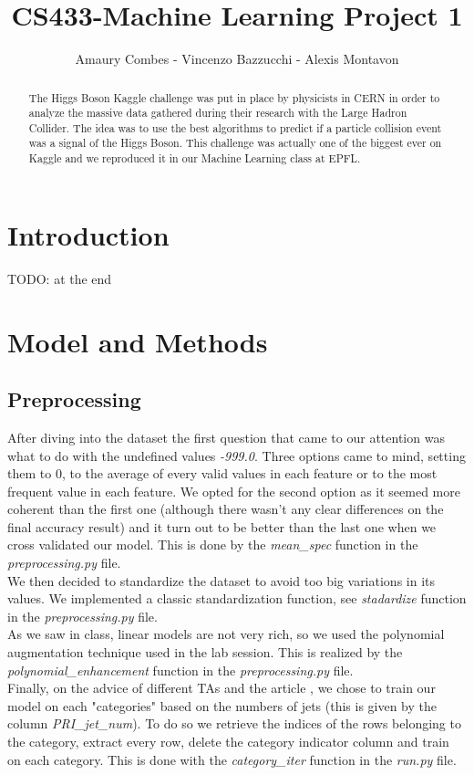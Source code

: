 \documentclass[10pt,conference,compsocconf]{IEEEtran}
\begin{document}
\title{CS433-Machine Learning Project 1}

\author{
  Amaury Combes - Vincenzo Bazzucchi - Alexis Montavon\\
}

\maketitle

\begin{abstract}
  The Higgs Boson Kaggle challenge was put in place by physicists in CERN in order to analyze the massive data gathered during their research with the Large Hadron Collider. The idea was to use the best algorithms to predict if a particle collision event was a signal of the Higgs Boson. This challenge was actually one of the biggest ever on Kaggle and we reproduced it in our Machine Learning class at EPFL.
\end{abstract}

\section{Introduction}

TODO: at the end

\section{Model and Methods}
\label{sec:model}
\subsection{Preprocessing}
After diving into the dataset the first question that came to our attention was what to do with the undefined values \textit{-999.0}. Three options came to mind, setting them to 0, to the average of every valid values in each feature or to the most frequent value in each feature. We opted for the second option as it seemed more coherent than the first one (although there wasn't any clear differences on the final accuracy result) and it turn out to be better than the last one when we cross validated our model. This is done by the \textit{mean\_spec} function in the \textit{preprocessing.py} file.\\ We then decided to standardize the dataset to avoid too big variations in its values. We implemented a classic standardization function, see \textit{stadardize} function in the \textit{preprocessing.py} file.\\ As we saw in class, linear models are not very rich, so we used the polynomial augmentation technique used in the lab session. This is realized by the \textit{polynomial\_enhancement} function in the \textit{preprocessing.py} file.\\
Finally, on the advice of different TAs and the article \cite{anderson04}, we chose to train our model on each "categories" based on the numbers of jets (this is given by the column \textit{PRI\_jet\_num}). To do so we retrieve the indices of the rows belonging to the category, extract every row, delete the category indicator column and train on each category. This is done with the \textit{category\_iter} function in the \textit{run.py} file.
\end{document}
